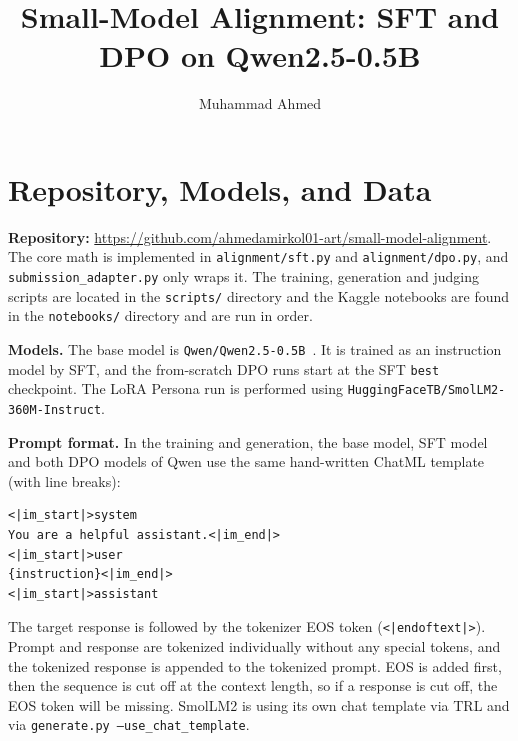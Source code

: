 \documentclass[10pt]{article}
\title{Small-Model Alignment: SFT and DPO on Qwen2.5-0.5B}
\author{Muhammad Ahmed}
\date{}
\begin{document}
\sloppy
\maketitle

\section{Repository, Models, and Data}

\textbf{Repository:} \url{https://github.com/ahmedamirkol01-art/small-model-alignment}.
The core math is implemented in \texttt{alignment/sft.py} and \texttt{alignment/dpo.py}, and \texttt{submission\_adapter.py} only wraps it.
The training, generation and judging scripts are located in the \texttt{scripts/} directory and the Kaggle notebooks are found in the \texttt{notebooks/} directory and are run in order.

\textbf{Models.} The base model is \texttt{Qwen/Qwen2.5-0.5B}~\cite{qwen}. It is trained as an instruction model by SFT, and the from-scratch DPO runs start at the SFT \texttt{best} checkpoint. The LoRA Persona run is performed using \texttt{HuggingFaceTB/SmolLM2-360M-Instruct}.

\textbf{Prompt format.} In the training and generation, the base model, SFT model and both DPO models of Qwen use the same hand-written ChatML template (with line breaks):
{\small
\begin{verbatim}
<|im_start|>system
You are a helpful assistant.<|im_end|>
<|im_start|>user
{instruction}<|im_end|>
<|im_start|>assistant
\end{verbatim}
}
\noindent The target response is followed by the tokenizer EOS token (\texttt{<|endoftext|>}).
Prompt and response are tokenized individually without any special tokens, and the tokenized response is appended to the tokenized prompt.
EOS is added first, then the sequence is cut off at the context length, so if a response is cut off, the EOS token will be missing.
SmolLM2 is using its own chat template via TRL and via \texttt{generate.py --use\_chat\_template}.
\end{document}
